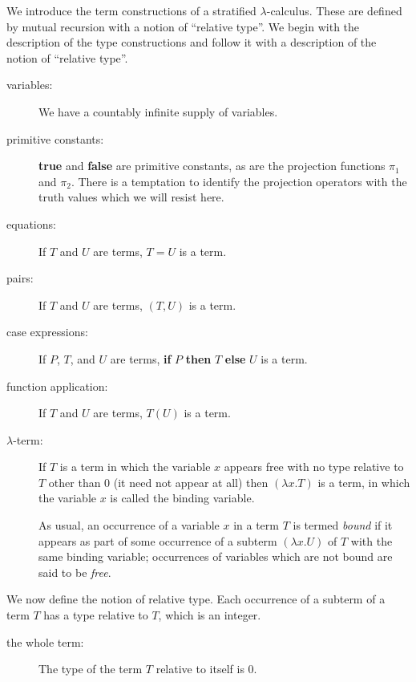 \documentclass{kluwer}
\begin{document}
\begin{article}
We introduce the term constructions of a stratified
$\lambda$-calculus.  These are defined by mutual recursion with a
notion of ``relative type''.  We begin with the description of the
type constructions and follow it with a description of the notion of
``relative type''.

\begin{description}

\item [variables:]  We have a countably infinite supply of variables.

\item [primitive constants:] {\bf true} and {\bf false} are primitive
constants, as are the projection functions $\pi_1$ and $\pi_2$.  There
is a temptation to identify the projection operators with the truth
values which we will resist here.

\item [equations:]  If $T$ and $U$ are terms, $T = U$ is a term.

\item [pairs:] If $T$ and $U$ are terms, $(T,U)$ is a term.

\item [case expressions:] If $P$, $T$, and $U$ are terms, {\bf if} $P$ {\bf then} $T$ {\bf else} $U$ is a term. 

\item [function application:]  If $T$ and $U$ are terms, $T(U)$ is a term.

\item [$\lambda$-term:]  If $T$ is a term in which the variable $x$ 
appears free with no type relative to $T$ other than 0 (it need not
appear at all) then $(\lambda x.T)$ is a term, in which the variable
$x$ is called the binding variable.

As usual, an occurrence of a variable $x$ in a term $T$ is termed {\em
bound\/} if it appears as part of some occurrence of a subterm
$(\lambda x.U)$ of $T$ with the same binding variable; occurrences of
variables which are not bound are said to be {\em free\/}.

\end{description}

We now define the notion of relative type.  Each occurrence of a
subterm of a term $T$ has a type relative to $T$, which is an integer.

\begin{description}

\item [the whole term:]  
The type of the term $T$ relative to itself is 0.


\end{description}
\end{article}
\end{document}
